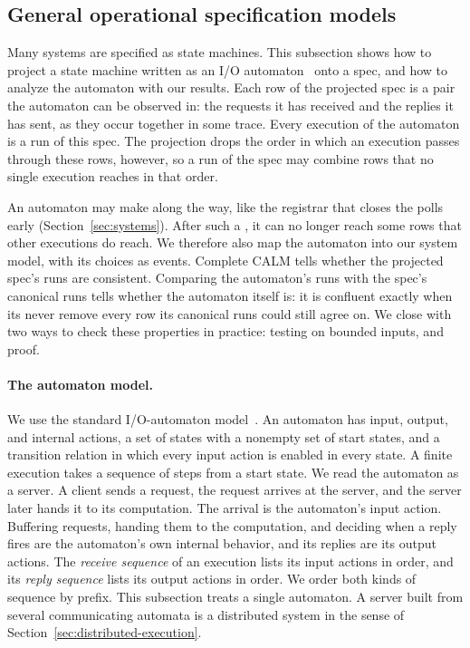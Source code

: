 \subsection{General operational specification models}
\label{sec:operational-models}
Many systems are specified as state machines.  This subsection shows how to
project a state machine written as an I/O automaton~\cite{lynch1987io} onto a
spec, and how to analyze the automaton with our results.  Each row of the
projected spec is a pair the automaton can be observed in: the requests it has
received and the replies it has sent, as they occur together in some trace.
Every execution of the automaton is a run of this spec.  The projection drops
the order in which an execution passes through these rows, however, so a run of
the spec may combine rows that no single execution reaches in that order.

An automaton may make \commitments along the way, like the registrar that closes
the polls early (Section~\ref{sec:systems}).  After such a \commitment, it can
no longer reach some rows that other executions do reach.  We therefore also
map the automaton into our system model, with its choices as \commitment
events.  Complete CALM tells whether the projected spec's runs are consistent.
Comparing the automaton's runs with the spec's canonical runs tells whether the
automaton itself is: it is confluent exactly when its \commitments never remove
every row its canonical runs could still agree on.  We close with two ways to
check these properties in practice: testing on bounded inputs, and proof.

\paragraph{The automaton model.}
We use the standard I/O-automaton
model~\cite{lynch1987io,lynch1996distributed}.  An automaton has input, output,
and internal actions, a set of states with a nonempty set of start states, and
a transition relation in which every input action is enabled in every state.
A finite execution takes a sequence of steps from a start state.  We read the
automaton as a server.  A client sends a request, the request arrives at the
server, and the server later hands it to its computation.  The arrival is the
automaton's input action.  Buffering requests, handing them to the computation,
and deciding when a reply fires are the automaton's own internal behavior, and
its replies are its output actions.  The \emph{receive sequence} of an
execution lists its input actions in order, and its \emph{reply sequence} lists
its output actions in order.  We order both kinds of sequence by prefix.  This
subsection treats a single automaton.  A server built from several
communicating automata is a distributed system in the sense of
Section~\ref{sec:distributed-execution}.

